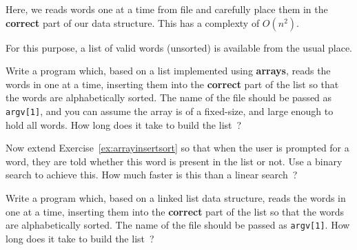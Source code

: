 
Here, we reads words one at a time
from file and carefully place them in the {\bf correct} part of
our data structure. This has a complexty of $O(n^2)$.

For this purpose, a list of valid words (unsorted) is available
from the usual place.

\begin{exercise}
\label{ex:arrayinsertsort}
Write a program which, based on a
list implemented using {\bf arrays}, reads the words in
one at a time, inserting them into the {\bf correct} part of the list
so that the words are alphabetically sorted.
The name of the file should be passed as \verb^argv[1]^,
and you can assume the array is of a fixed-size,
and large enough to hold all words.
How long does it take to build the list~?
\end{exercise}

\begin{exercise}
Now extend Exercise~\ref{ex:arrayinsertsort}
so that when the user is prompted for a word,
they are told whether this word is present in the list or not.
Use a binary search to achieve this.
How much faster is this than a linear search~?
\end{exercise}

\begin{exercise}
Write a program which, based on a
linked list data structure, reads the words in
one at a time, inserting them into the {\bf correct} part of the list
so that the words are alphabetically sorted.
The name of the file should be passed as \verb^argv[1]^.
How long does it take to build the list~?
\end{exercise}

